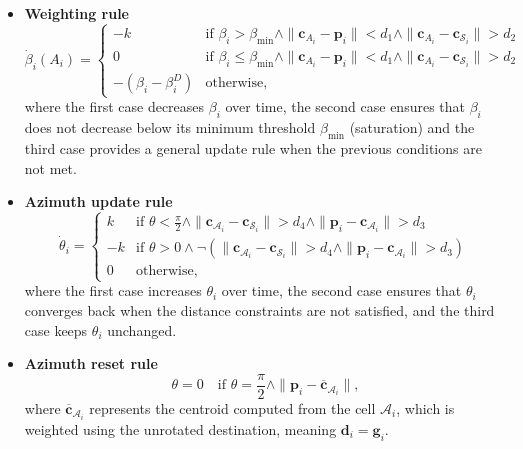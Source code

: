         \begin{itemize}
            \item \textbf{Weighting rule}
                \begin{equation}
                    \label{eqn:beta_weighting}
                    \dot{\beta}_i(A_i) = 
                    \begin{cases}
                        -k & \text{if } \beta_i > \beta_{\min} \land \|\mathbf{c}_{A_i} - \mathbf{p}_i\| < d_1 \land \|\mathbf{c}_{A_i} - \mathbf{c}_{\mathcal{S}_i}\| > d_2  \\
                        0  & \text{if } \beta_i \leq \beta_{\min} \land \|\mathbf{c}_{A_i} - \mathbf{p}_i\| < d_1 \land \|\mathbf{c}_{A_i} - \mathbf{c}_{\mathcal{S}_i}\| > d_2  \\
                        -(\beta_i - \beta_i^D) & \text{otherwise}\text{,}
                    \end{cases}
                \end{equation}
                where the first case decreases $\beta_i$ over time, the second case ensures that $\beta_i$ does not decrease below its minimum threshold $\beta_{\min}$ (saturation) and the third case provides a general update rule when the previous conditions are not met.
            \item \textbf{Azimuth update rule}
                \begin{equation}
                    \label{eqn:azimuth_2d}
                    \dot{\theta}_i = 
                    \begin{cases}
                        k  & \text{if } \theta < \frac{\pi}{2} \land \|\mathbf{c}_{\mathcal{A}_i} - \mathbf{c}_{\mathcal{S}_i}\| > d_4 \land \|\mathbf{p}_i - \mathbf{c}_{\mathcal{A}_i}\| > d_3 \\
                        -k & \text{if } \theta > 0 \land \neg (\|\mathbf{c}_{\mathcal{A}_i} - \mathbf{c}_{\mathcal{S}_i}\| > d_4 \land \|\mathbf{p}_i - \mathbf{c}_{\mathcal{A}_i}\| > d_3) \\
                        0  & \text{otherwise}\text{,}
                    \end{cases}
                \end{equation}
                where the first case increases $\theta_i$ over time, the second case ensures that $\theta_i$ converges back when the distance constraints are not satisfied, and the third case keeps $\theta_i$ unchanged.
            \item \textbf{Azimuth reset rule}
                \begin{equation}
                    \label{eqn:azimuth_reset_2d}
                    \theta = 0 \quad \text{if } \theta = \frac{\pi}{2} \land \| \mathbf{p}_i - \mathbf{\overline{c}}_{\mathcal{A}_i} \|\text{,}
                \end{equation}
                where $\mathbf{\overline{c}}_{\mathcal{A}_i}$ represents the centroid computed from the cell $\mathcal{A}_i$, which is weighted using the unrotated destination, meaning $\mathbf{d}_i = \mathbf{g}_i$.
        \end{itemize}
